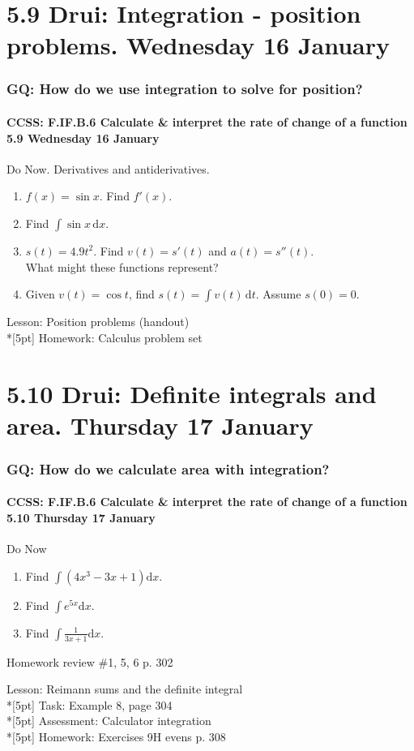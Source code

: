 \documentclass{beamer}
\begin{document}
\section{5.9 Drui: Integration - position problems. Wednesday 16 January}
\frame
{
  \frametitle{GQ: How do we use integration to solve for position?}
  \framesubtitle{CCSS: F.IF.B.6 Calculate \& interpret the rate of change of a function  \alert{5.9 Wednesday 16 January}}

  \begin{block}{Do Now. Derivatives and antiderivatives.}
  \begin{enumerate}
    \item $f(x)=\sin x$. Find $f'(x)$.
    \item Find $\int \sin x \,\mathrm{d}x$.

    \item $s(t)= 4.9 t^2$. Find $v(t)=s'(t)$ and $a(t)=s''(t)$.\\
    What might these functions represent?

    \item Given $v(t)=\cos t$, find $s(t)=\int v(t) \,\mathrm{d}t$. Assume $s(0)=0$.

  \end{enumerate}
  \end{block}
  Lesson: Position problems (handout)\\*[5pt]
  Homework: Calculus problem set
}


  \section{5.10 Drui: Definite integrals and area. Thursday 17 January}
  \frame
  {
    \frametitle{GQ: How do we calculate area with integration?}
    \framesubtitle{CCSS: F.IF.B.6 Calculate \& interpret the rate of change of a function  \alert{5.10 Thursday 17 January}}

    \begin{block}{Do Now}
    \begin{enumerate}
        \item Find $\int{(4x^3-3x+1)}\mathrm{d}x$.
        \item Find $\int e^{5x}\mathrm{d}x$.
        \item Find $\displaystyle \int \frac{1}{3x+1} \mathrm{d}x$.
    \end{enumerate}
    Homework review \#1, 5, 6 p. 302
    \end{block}
    Lesson: Reimann sums and the definite integral\\*[5pt]
    Task: Example 8, page 304\\*[5pt]
    Assessment: Calculator integration \\*[5pt]
    Homework: Exercises 9H evens p. 308
  }
\end{document}
